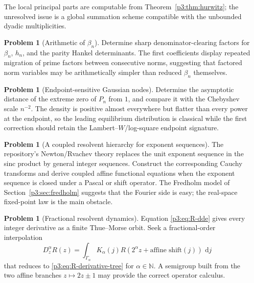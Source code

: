 \documentclass[11pt]{article}
\theoremstyle{definition}
\newtheorem{problem}[theorem]{Problem}
\theoremstyle{remark}
\newcommand{\N}{\mathbb N}
\newcommand{\dd}{\,\mathrm d}
\begin{document}
The local principal parts are computable from Theorem~\ref{p3:thm:hurwitz}; the unresolved
issue is a global summation scheme compatible with the unbounded dyadic multiplicities.

\begin{problem}[Arithmetic of \(\beta_n\)]
Determine sharp denominator-clearing factors for \(\beta_n\), \(h_n\), and the parity
Hankel determinants.  The first coefficients display repeated migration of prime factors
between consecutive norms, suggesting that factored norm variables may be arithmetically
simpler than reduced \(\beta_n\) themselves.
\end{problem}

\begin{problem}[Endpoint-sensitive Gaussian nodes]
Determine the asymptotic distance of the extreme zero of \(P_n\) from \(1\), and compare it
with the Chebyshev scale \(n^{-2}\).  The density is positive almost everywhere but flatter
than every power at the endpoint, so the leading equilibrium distribution is classical
while the first correction should retain the Lambert--\(W\)/log-square endpoint signature.
\end{problem}

\begin{problem}[A coupled resolvent hierarchy for exponent sequences]
The repository's Newton/Rvachev theory replaces the unit exponent sequence in the sinc
product by general integer sequences.  Construct the corresponding Cauchy transforms and
derive coupled affine functional equations when the exponent sequence is closed under a
Pascal or shift operator.  The Fredholm model of Section~\ref{p3:sec:fredholm} suggests that
the Fourier side is easy; the real-space fixed-point law is the main obstacle.
\end{problem}

\begin{problem}[Fractional resolvent dynamics]
Equation \eqref{p3:eq:R-dde} gives every integer derivative as a finite Thue--Morse orbit.
Seek a fractional-order interpolation
\[
 D_z^{\alpha}R(z)=\int_{\Gamma_\alpha}K_\alpha(j)
 R(2^\alpha z+\text{affine shift}(j))\,\dd j
\]
that reduces to \eqref{p3:eq:R-derivative-tree} for \(\alpha\in\N\).  A semigroup built from
the two affine branches \(z\mapsto2z\pm1\) may provide the correct operator calculus.
\end{problem}
\end{document}

